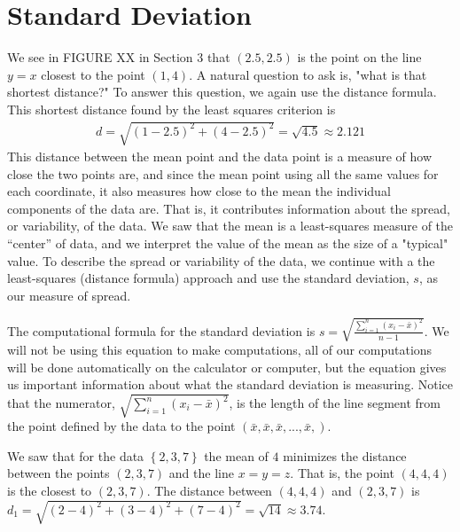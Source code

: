 \documentclass[10pt,]{book}
\theoremstyle{ptxdefinitionnotitle}
\theoremstyle{ptxdefinitiontitle}
\numberwithin{equation}{section}
\begin{document}
\section[{Standard Deviation}]{Standard Deviation}\label{chapter01-section09}
\hypertarget{p-116}{}%
We see in FIGURE XX in Section 3 that \(\left( 2.5, 2.5 \right)\) is the point on the line \(y = x\) closest to the point \(\left( 1, 4 \right)\). A natural question to ask is, "what is that shortest distance?" To answer this question, we again use the distance formula. This shortest distance found by the least squares criterion is%
\begin{gather*}
d = \sqrt{ \left( 1 - 2.5 \right)^2 + \left( 4 - 2.5 \right)^2} = \sqrt{ 4.5 } \approx 2.121
\end{gather*}
This distance between the mean point and the data point is a measure of how close the two points are, and since the mean point using all the same values for each coordinate, it also measures how close to the mean the individual components of the data are. That is, it contributes information about the spread, or variability, of the data. We saw that the mean is a least-squares measure of the “center” of data, and we interpret the value of the mean as the size of a "typical" value. To describe the spread or variability of the data, we continue with a the least-squares (distance formula) approach and use the standard deviation, \(s\), as our measure of spread.%
\par
\hypertarget{p-117}{}%
The computational formula for the standard deviation is \(s = \sqrt{ \frac{ \sum_{i=1}^n \left( x_i - \bar{x} \right) ^2 }{ n - 1 } }\). We will not be using this equation to make computations, all of our computations will be done automatically on the calculator or computer, but the equation gives us important information about what the standard deviation is measuring.  Notice that the numerator, \(\sqrt{ \sum_{i=1}^n \left( x_i - \bar{x} \right) ^2 }\), is the length of the line segment from the point defined by the data to the point \(\left( \bar{x}, \bar{x}, \bar{x}, ..., \bar{x}, \right)\).%
\par
\hypertarget{p-118}{}%
We saw that for the data \(\left\{ 2,3,7 \right\}\) the mean of \(4\) minimizes the distance between the points \(\left( 2,3,7 \right)\) and the line \(x = y = z\). That is, the point \(\left( 4, 4, 4 \right)\) is the closest to \(\left( 2, 3, 7 \right)\). The distance between \(\left( 4, 4, 4 \right)\) and \(\left( 2, 3, 7 \right)\) is  \(d_1 = \sqrt{ (2-4)^2 + (3-4)^2 + (7-4)^2 } = \sqrt{14} \approx 3.74\).%
\end{document}
